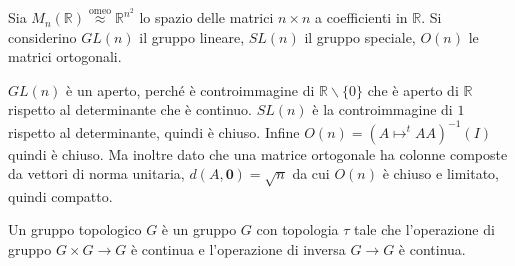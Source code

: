 \begin{example}
    Sia \(M_n(\mathbb{R}) \stackrel{\text{omeo}}{\approx} \mathbb{R}^{n^2}\) lo spazio delle matrici \(n \times n\) a
    coefficienti in \(\mathbb{R}\). Si considerino \(GL(n)\) il gruppo lineare,
    \(SL(n)\) il gruppo speciale, \(O(n)\) le matrici ortogonali.

    \(GL(n)\) è un aperto, perché è controimmagine di \(\mathbb{R}
    \smallsetminus \{0\} \) che è aperto di \(\mathbb{R}\) rispetto al
    determinante che è continuo. \(SL(n)\) è la
    controimmagine di \(1\) rispetto al determinante, quindi è chiuso.
    Infine \(O(n) = (A \mapsto ^{t}A A )^{-1}(I)\) quindi è chiuso. Ma inoltre
    dato che una matrice ortogonale ha colonne composte da vettori di norma
    unitaria, \(d(A, \mathbf{0}) = \sqrt{n}\) da cui \(O(n)\) è chiuso e
    limitato, quindi compatto.
\end{example}

\begin{definition}
    Un gruppo topologico \(G\) è un gruppo \(G\) con topologia \(\tau\) tale che
    l'operazione di gruppo \(G \times G \to G\) è continua e l'operazione di
    inversa \(G \to G\) è continua.
\end{definition}

